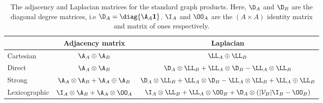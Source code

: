 \begin{table}[h]
    \def\arraystretch{1.8}
    \centering
    \small
    \vspace{0.5cm}
    \begin{tabular}{|l|cc|}
        \hline

         & Adjacency matrix
         & Laplacian                                                                              \\

        \hline

        Cartesian
         & $\A_A \oplus \A_B$
         & $\LL_A \oplus \LL_B$                                                                   \\

        Direct
         & $\A_A \otimes \A_B$
         & $\D_A \otimes \LL_B + \LL_A \otimes \D_B - \LL_A \otimes \LL_B$                        \\

        Strong
         & $\A_A \otimes \A_B + \A_A \oplus \A_B$
         & $\D_A \otimes \LL_B + \LL_A \otimes \D_B - \LL_A \otimes \LL_B + \LL_A \oplus \LL_B$   \\

        Lexicographic
         & $\I_A \otimes \A_B + \A_A \otimes \OO_A$
         & $\I_A \otimes \LL_B + \LL_A \otimes \OO_B + \D_A \otimes (|\mathcal{V}_B| \I_B - \OO_B)$ \\

        \hline
    \end{tabular}
    \vspace{0.2cm}
    \caption[The adjacency and Laplacian matrices for the standard graph products]{The adjacency and Laplacian matrices for the standard graph products. Here, $\D_A$ and $\D_B$ are the diagonal degree matrices, i.e $\D_A = \diag{\A_A \mathbf{1}}$. $\I_A$ and $\OO_A$ are the $(A \times A)$ identity matrix and matrix of ones respectively. }
    \vspace{0.3cm}
    \label{tab:grap_product_matrices}
\end{table}

